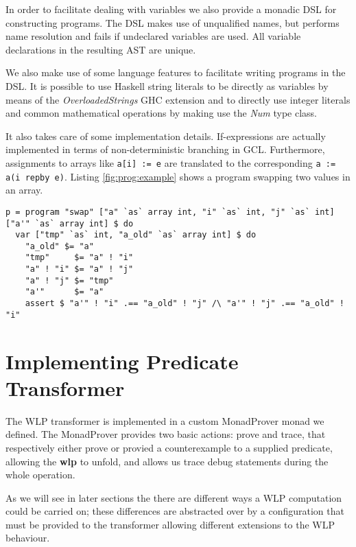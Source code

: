 \documentclass[]{scrartcl}
\begin{document}
In order to facilitate dealing with variables we also provide a monadic DSL for constructing programs.
The DSL makes use of unqualified names, but performs name resolution and fails if undeclared variables
are used. All variable declarations in the resulting AST are unique.

We also make use of some language features to facilitate writing programs in the DSL.
It is possible to use Haskell string literals to be directly as variables by means of the
\emph{OverloadedStrings} GHC extension and to directly use integer literals and common mathematical
operations by making use the \emph{Num} type class.

It also takes care of some implementation details. If-expressions are actually implemented in terms of
non-deterministic branching in GCL. Furthermore, assignments to arrays like
\lstinline|a[i] := e| are translated to the corresponding \lstinline|a := a(i repby e)|.
Listing \ref{fig:prog:example} shows a program swapping two values in an array.

\begin{lstlisting}[caption=A program swapping the values at two indices in an array, label=fig:prog:example]
p = program "swap" ["a" `as` array int, "i" `as` int, "j" `as` int] ["a'" `as` array int] $ do
  var ["tmp" `as` int, "a_old" `as` array int] $ do
    "a_old" $= "a"
    "tmp"     $= "a" ! "i"
    "a" ! "i" $= "a" ! "j"
    "a" ! "j" $= "tmp"
    "a'"      $= "a"
    assert $ "a'" ! "i" .== "a_old" ! "j" /\ "a'" ! "j" .== "a_old" ! "i"
\end{lstlisting}

\section{Implementing Predicate Transformer}

The WLP transformer is implemented in a custom MonadProver monad we defined.
The MonadProver provides two basic actions: prove and trace, that respectively
either prove or provied a counterexample to a supplied predicate, allowing the
\textbf{wlp} to unfold, and allows us trace debug statements during the whole operation.

As we will see in later sections the there are different ways a WLP computation
could be carried on; these differences are abstracted over by a configuration
that must be provided to the transformer allowing different extensions to the
WLP behaviour.
\end{document}
